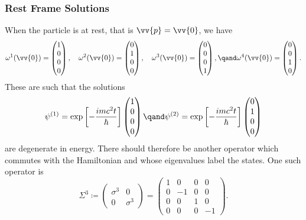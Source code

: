 \subsubsection{Rest Frame Solutions}
When the particle is at rest, that is \(\vv{p} = \vv{0}\), we have
\begin{equation}
    \omega^1(\vv{0}) = 
    \begin{pmatrix}
        1\\ 0\\ 0\\ 0
    \end{pmatrix}
    , \quad \omega^2(\vv{0}) = 
    \begin{pmatrix}
        0\\ 1\\ 0\\ 0
    \end{pmatrix}
    , \quad \omega^3(\vv{0}) = 
    \begin{pmatrix}
        0\\ 0\\ 0\\ 1
    \end{pmatrix}
    , \qand \omega^4(\vv{0}) = 
    \begin{pmatrix}
        0\\ 0\\ 1\\ 0
    \end{pmatrix}
    .
\end{equation}
These are such that the solutions
\begin{equation}
    \psi^{(1)} = \exp\left[ -\frac{imc^2t}{\hbar} \right] 
    \begin{pmatrix}
        1\\ 0\\ 0\\ 0
    \end{pmatrix}
    \qand
    \psi^{(2)} = \exp\left[ -\frac{imc^2t}{\hbar} \right]
    \begin{pmatrix}
        0\\ 1\\ 0\\ 0
    \end{pmatrix}
\end{equation}
are degenerate in energy.
There should therefore be another operator which commutes with the Hamiltonian and whose eigenvalues label the states.
One such operator is
\begin{equation}
    \Sigma^3 \coloneqq
    \begin{pmatrix}
        \sigma^3 & 0\\
        0 & \sigma^3
    \end{pmatrix}
    = 
    \begin{pmatrix}
        1 & 0 & 0 & 0\\
        0 & -1 & 0 & 0\\
        0 & 0 & 1 & 0\\
        0 & 0 & 0 & -1
    \end{pmatrix}
    .
\end{equation}
